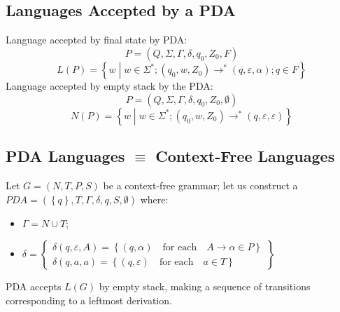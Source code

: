 \subsection{Languages Accepted by a PDA}
Language accepted by final state by PDA:
$$
	P = (Q, \Sigma, \Gamma, \delta, q_0, Z_0, F)
$$
$$
	L(P) = \left\{w \middle| w \in \Sigma^\ast; (q_0, w, Z_0) \to^\ast (q, \varepsilon, \alpha); q \in F \right\}
$$
Language accepted by empty stack by the PDA:
$$
	P = (Q, \Sigma, \Gamma, \delta, q_0, Z_0, \emptyset)
$$
$$
	N(P) = \left\{w \middle| w \in \Sigma^\ast; (q_0, w, Z_0) \to^\ast (q, \varepsilon, \varepsilon) \right\}
$$

\subsection{PDA Languages $\equiv$ Context-Free Languages}
Let $G = (N, T, P, S)$ be a context-free grammar; let us construct a $PDA = (\left\{q\right\}, T, \Gamma, \delta, q, S, \emptyset)$ where:
\begin{itemize}
	\item $\Gamma = N \cup T$;
	\item $\delta = \begin{Bmatrix}
		\delta(q, \varepsilon, A) = \left\{(q, \alpha) \quad \text{for each} \quad A \to \alpha \in P \right\} \\
		\delta(q, a, a) = \left\{(q, \varepsilon) \quad \text{for each} \quad a \in T \right\}
		\end{Bmatrix}$
\end{itemize}
PDA accepts $L(G)$ by empty stack, making a sequence of transitions corresponding to a leftmost derivation.
